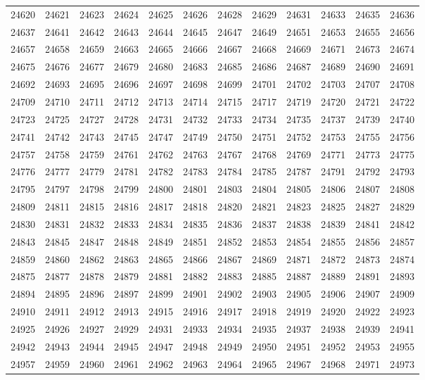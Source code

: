 \begin{center}
\begin{longtable}{llllllllllll}
24620 &24621 &24623 &24624 &24625 &24626 &24628 &24629 &24631 &24633 &24635 &24636 \\
24637 &24641 &24642 &24643 &24644 &24645 &24647 &24649 &24651 &24653 &24655 &24656 \\
24657 &24658 &24659 &24663 &24665 &24666 &24667 &24668 &24669 &24671 &24673 &24674 \\
24675 &24676 &24677 &24679 &24680 &24683 &24685 &24686 &24687 &24689 &24690 &24691 \\
24692 &24693 &24695 &24696 &24697 &24698 &24699 &24701 &24702 &24703 &24707 &24708 \\
24709 &24710 &24711 &24712 &24713 &24714 &24715 &24717 &24719 &24720 &24721 &24722 \\
24723 &24725 &24727 &24728 &24731 &24732 &24733 &24734 &24735 &24737 &24739 &24740 \\
24741 &24742 &24743 &24745 &24747 &24749 &24750 &24751 &24752 &24753 &24755 &24756 \\
24757 &24758 &24759 &24761 &24762 &24763 &24767 &24768 &24769 &24771 &24773 &24775 \\
24776 &24777 &24779 &24781 &24782 &24783 &24784 &24785 &24787 &24791 &24792 &24793 \\
24795 &24797 &24798 &24799 &24800 &24801 &24803 &24804 &24805 &24806 &24807 &24808 \\
24809 &24811 &24815 &24816 &24817 &24818 &24820 &24821 &24823 &24825 &24827 &24829 \\
24830 &24831 &24832 &24833 &24834 &24835 &24836 &24837 &24838 &24839 &24841 &24842 \\
24843 &24845 &24847 &24848 &24849 &24851 &24852 &24853 &24854 &24855 &24856 &24857 \\
24859 &24860 &24862 &24863 &24865 &24866 &24867 &24869 &24871 &24872 &24873 &24874 \\
24875 &24877 &24878 &24879 &24881 &24882 &24883 &24885 &24887 &24889 &24891 &24893 \\
24894 &24895 &24896 &24897 &24899 &24901 &24902 &24903 &24905 &24906 &24907 &24909 \\
24910 &24911 &24912 &24913 &24915 &24916 &24917 &24918 &24919 &24920 &24922 &24923 \\
24925 &24926 &24927 &24929 &24931 &24933 &24934 &24935 &24937 &24938 &24939 &24941 \\
24942 &24943 &24944 &24945 &24947 &24948 &24949 &24950 &24951 &24952 &24953 &24955 \\
24957 &24959 &24960 &24961 &24962 &24963 &24964 &24965 &24967 &24968 &24971 &24973 \\

\end{longtable}
\end{center}
